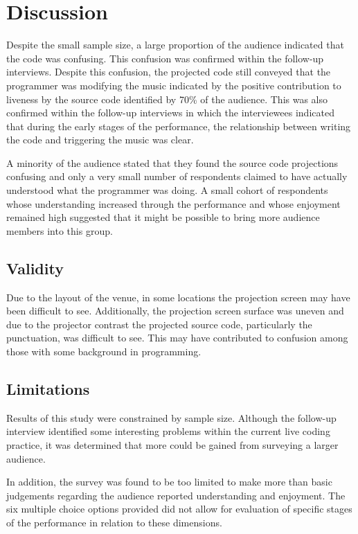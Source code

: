 \section{Discussion}

Despite the small sample size, a large proportion of the audience indicated that the code was confusing. This confusion was confirmed within the follow-up interviews. Despite this confusion, the projected code still conveyed that the programmer was modifying the music indicated by the positive contribution to liveness by the source code identified by 70\% of the audience. This was also confirmed within the follow-up interviews in which the interviewees indicated that during the early stages of the performance, the relationship between writing the code and triggering the music was clear.

A minority of the audience stated that they found the source code projections confusing and only a very small number of respondents claimed to have actually understood what the programmer was doing. A small cohort of respondents whose understanding increased through the performance and whose enjoyment remained high suggested that it might be possible to bring more audience members into this group.

\subsection{Validity}

Due to the layout of the venue, in some locations the projection screen may have been difficult to see. Additionally, the projection screen surface was uneven and due to the projector contrast the projected source code, particularly the punctuation, was difficult to see. This may have contributed to confusion among those with some background in programming.

\subsection{Limitations}

Results of this study were constrained by sample size. Although the follow-up interview identified some interesting problems within the current live coding practice, it was determined that more could be gained from surveying a larger audience.

In addition, the survey was found to be too limited to make more than basic judgements regarding the audience reported understanding and enjoyment. The six multiple choice options provided did not allow for evaluation of specific stages of the performance in relation to these dimensions.

